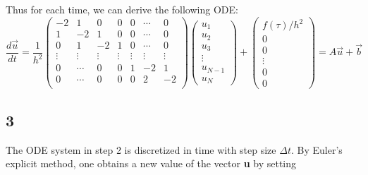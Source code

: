 \documentclass[11pt,a4paper,roman]{scrartcl}
\begin{document}
Thus for each time, we can derive the following ODE: 
\begin{equation}
\frac{d\vec{u}}{dt} = \frac{1}{h^2} 
\begin{pmatrix}
  -2 &  1  &  0  &  0  &  0  & \cdots & 0 \\
  1  & -2  &  1  &  0  &  0  & \cdots & 0\\
  0  &  1  & -2  &  1  &  0  & \cdots & 0\\
  \vdots  & \vdots  & \vdots & \vdots & \vdots & \vdots & \vdots \\
  0 & \cdots & 0 & 0 & 1 & -2 & 1 \\
  0 & \cdots & 0 & 0 & 0 &  2 & -2 \\
 \end{pmatrix}
 \begin{pmatrix}
 u_1 \\ u_2 \\ u_3 \\ \vdots \\ u_{N-1} \\ u_N
 \end{pmatrix}
 +
 \begin{pmatrix}
 f(\tau)/h^2 \\ 0 \\ 0 \\ \vdots \\ 0 \\ 0
 \end{pmatrix} = A\vec{u} + \vec{b}
\end{equation}

































\subsection*{3}

The ODE system in step 2 is discretized in time with step size $\Delta t$. By Euler's explicit method, one obtains a new value of the vector \textbf{u} by setting
\end{document}
